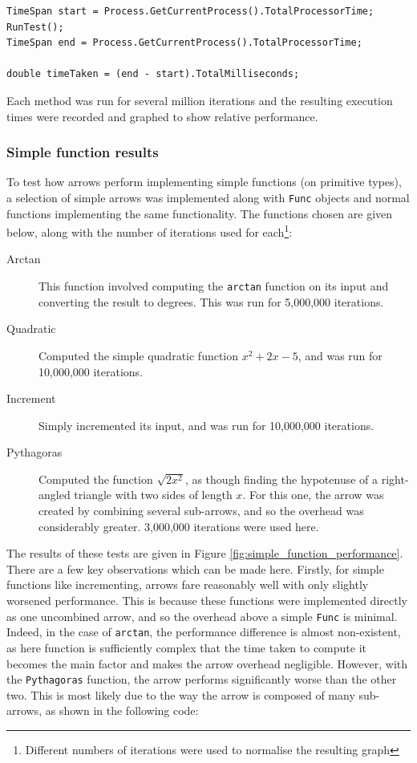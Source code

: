 \documentclass[12pt,twoside,notitlepage]{report}
\begin{document}
\begin{lstlisting}[language={[sharp]C}]
TimeSpan start = Process.GetCurrentProcess().TotalProcessorTime;
RunTest();
TimeSpan end = Process.GetCurrentProcess().TotalProcessorTime;

double timeTaken = (end - start).TotalMilliseconds;
\end{lstlisting}

Each method was run for several million iterations and the resulting execution times were recorded and graphed to show relative performance.

\subsubsection{Simple function results}

To test how arrows perform implementing simple functions (on primitive types), a selection of simple arrows was implemented along with \texttt{Func} objects and normal functions implementing the same functionality. The functions chosen are given below, along with the number of iterations used for each\footnote{Different numbers of iterations were used to normalise the resulting graph}:

\begin{description}
	\item[Arctan] This function involved computing the \texttt{arctan} function on its input and converting the result to degrees. This was run for 5,000,000 iterations.
	\item[Quadratic] Computed the simple quadratic function $x^2 + 2x - 5$, and was run for 10,000,000 iterations.
	\item[Increment] Simply incremented its input, and was run for 10,000,000 iterations.
	\item[Pythagoras] Computed the function $\sqrt{2 x^2}$, as though finding the hypotenuse of a right-angled triangle with two sides of length $x$. For this one, the arrow was created by combining several sub-arrows, and so the overhead was considerably greater. 3,000,000 iterations were used here.
\end{description}

The results of these tests are given in Figure \ref{fig:simple_function_performance}. There are a few key observations which can be made here. Firstly, for simple functions like incrementing, arrows fare reasonably well with only slightly worsened performance. This is because these functions were implemented directly as one uncombined arrow, and so the overhead above a simple \texttt{Func} is minimal. Indeed, in the case of \texttt{arctan}, the performance difference is almost non-existent, as here function is sufficiently complex that the time taken to compute it becomes the main factor and makes the arrow overhead negligible. However, with the \texttt{Pythagoras} function, the arrow performs significantly worse than the other two. This is most likely due to the way the arrow is composed of many sub-arrows, as shown in the following code:
\end{document}
